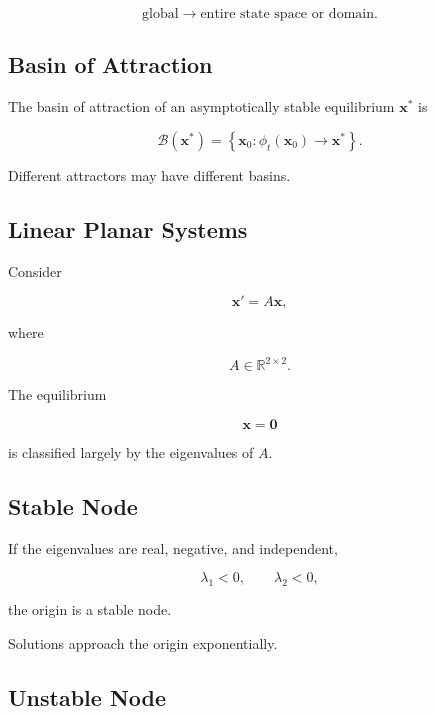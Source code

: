 \[
\boxed{
\text{global}
\rightarrow
\text{entire state space or domain}.
}
\]

\subsection{Basin of Attraction}
\label{subsec:basin-attraction}

The basin of attraction of an asymptotically stable equilibrium
\(\mathbf{x}^*\) is

\[
\boxed{
\mathcal{B}(\mathbf{x}^*)
=
\left\{
\mathbf{x}_0:
\phi_t(\mathbf{x}_0)
\to
\mathbf{x}^*
\right\}.
}
\]

Different attractors may have different basins.

\subsection{Linear Planar Systems}
\label{subsec:dynamical-linear-planar-systems}

Consider

\[
\boxed{
\mathbf{x}'
=
A\mathbf{x},
}
\]

where

\[
A
\in
\mathbb{R}^{2\times2}.
\]

The equilibrium

\[
\mathbf{x}=\mathbf{0}
\]

is classified largely by the eigenvalues of \(A\).

\subsection{Stable Node}
\label{subsec:dynamical-stable-node}

If the eigenvalues are real, negative, and independent,

\[
\boxed{
\lambda_1<0,
\qquad
\lambda_2<0,
}
\]

the origin is a stable node.

Solutions approach the origin exponentially.

\subsection{Unstable Node}
\label{subsec:dynamical-unstable-node}

